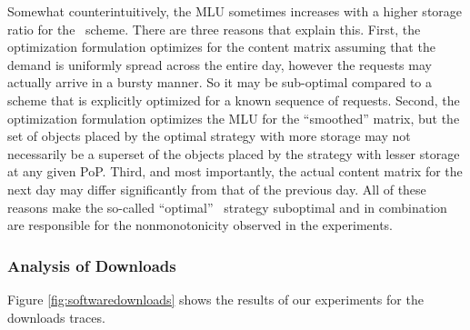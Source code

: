 {%


 
Somewhat counterintuitively, the MLU sometimes increases with a higher storage ratio for the \optrp\ scheme. There are three reasons that explain this. First, the optimization formulation optimizes for the content matrix assuming that the demand is uniformly spread across the entire day, however the requests may actually arrive in a bursty manner. So it may be sub-optimal compared to a scheme that is explicitly optimized for a known sequence of requests. Second,  the optimization formulation optimizes the MLU for the ``smoothed'' matrix, but the set of objects placed by the optimal strategy with more storage may not necessarily be a superset of the objects placed by the strategy with lesser storage at any given PoP. Third, and most importantly, the actual content matrix for the next day may differ significantly from that of the previous day. All of these reasons make the so-called ``optimal'' \optrp\ strategy suboptimal and in combination are responsible for the nonmonotonicity observed in the experiments.





\subsubsection{Analysis of Downloads}
\label{sec:downloads}

Figure \ref{fig:softwaredownloads} shows the results of our experiments for the downloads traces.  

}
